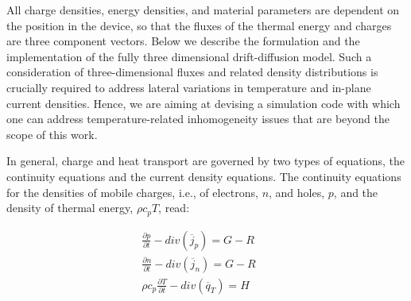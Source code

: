 \documentclass[%
9pt,
 aip,
rsi,%
 amsmath,amssymb,
preprint,%
]{revtex4-1}
\begin{document}
All charge densities, energy densities, and material parameters are dependent on the position in the device, %
so that the fluxes of the thermal energy and charges are three component vectors.
Below we describe the formulation and the implementation of the fully three dimensional drift-diffusion model.
Such a consideration of three-dimensional fluxes and related density distributions is crucially required to address lateral variations in temperature and in-plane current densities. 
Hence, we are aiming at devising a simulation code with which one can address temperature-related inhomogeneity issues that are beyond the scope of this work. 

In general, charge and heat transport are governed by two types of equations, the continuity equations and the current density equations.
The continuity equations for the densities of mobile charges, i.e., of electrons, $n$, and holes, $p$, and the density of thermal energy, $\rho c_p T$, read:

\begin{subequations}
	\begin{gather}
		\frac{\partial p}{\partial t} - div\left( \overline{j}_p\right) =G-R\label{eq:contp}\\	
		\frac{\partial n}{\partial t} - div\left( \overline{j}_n\right)=G-R\label{eq:contn}\\
		\rho c_p \frac{\partial T}{\partial t}-div\left(\overline{q}_T\right)=H\label{eq:contT}\qquad 
	\end{gather}
    \label{eq:cont}
\end{subequations}
\end{document}
